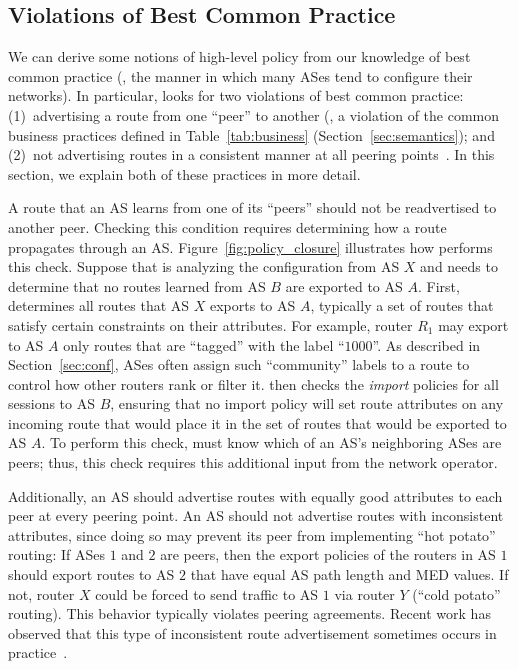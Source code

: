 \subsection{Violations of Best Common Practice}

We can derive some notions of high-level policy from our knowledge of
best common practice (\ie, the manner in which many ASes
tend to configure their 
networks).  In particular, \rcc looks for two violations of best common
practice: (1)~advertising a route from one ``peer'' to another (\ie, a
violation of the common business practices defined in
Table~\ref{tab:business} (Section~\ref{sec:semantics}); and (2)~not
advertising routes in a consistent manner at all peering
points~\cite{Feamster2004b}.  In this section, we explain both of these
practices in more detail.

A route that an AS learns from one of its ``peers'' should not be
readvertised to another peer.  Checking this condition requires
determining how a route propagates through an AS.
Figure~\ref{fig:policy_closure} illustrates how \rcc performs this
check.  Suppose that \rcc is analyzing the configuration from AS $X$ and
needs to determine that no routes learned from AS $B$ are exported to
AS $A$.  First, \rcc determines all routes that AS $X$ exports to AS $A$,
typically a set of routes that satisfy certain constraints on their
attributes. For example, router $R_1$ may export to AS $A$ only routes
that are ``tagged'' with the label ``$1000$''.  As described in
Section~\ref{sec:conf}, ASes often assign such ``community'' labels to a
route to
control how other routers rank or filter it. \rcc then checks the {\em
import} policies for all sessions to AS $B$, ensuring that no import
policy will set route attributes on any incoming route that would place
it in the set of routes that would be exported to AS $A$.  To perform
this check, \rcc must know which of an AS's neighboring ASes are peers;
thus, this check requires this additional input from the network
operator.

Additionally, an AS should advertise routes with equally good attributes
to each peer at every peering point.  An AS should not advertise routes
with inconsistent attributes, since doing so may prevent its peer from
implementing ``hot potato'' routing:
If ASes $1$ and $2$ are
peers, then the export policies of the routers in AS $1$ should export
routes to AS $2$ that have equal AS path length and MED values.  If not,
router $X$ could be forced to send traffic to AS $1$ via router $Y$
(``cold potato'' routing).
This behavior typically violates peering
agreements.  Recent work has observed that this type of inconsistent
route advertisement sometimes occurs in practice~\cite{Feamster2004b}.

